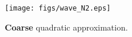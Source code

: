 \documentclass[compress]{beamer}
\begin{document}
{\begin{columns}
\begin{column}{.475\textwidth}
\begin{figure}
\begin{overlayarea}{\textwidth}{.5\textheight}
{\texttt{[image: figs/wave\_N2.eps]}
\caption*{\textbf{Coarse} quadratic approximation.}
}
\end{overlayarea}
\end{figure}
\end{column}
\end{columns}

}
\end{document}
